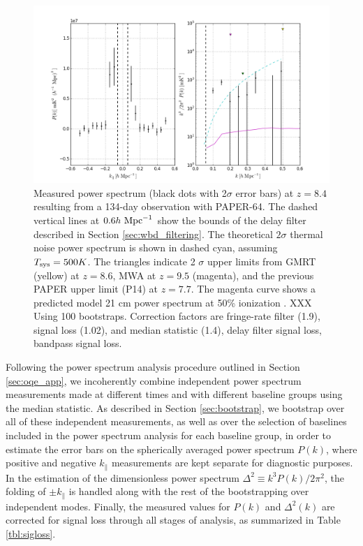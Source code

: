 \documentclass[twocolumn,numberedappendix]{emulateapj} \shorttitle{PSA64}
\newcommand{\hMpci}{h\ {\rm Mpc}^{-1}}
\newcommand{\Tsys}{T_{\rm sys}}
\begin{document}
\begin{figure}\centering
\includegraphics[width=2\columnwidth]{plots/pk_k3pk.png}
\caption{
Measured power spectrum (black dots with 2$\sigma$ error bars) at $z=8.4$
resulting from a 134-day observation with PAPER-64.  The dashed vertical lines
at $0.6\hMpci$ show the bounds of the delay filter described in Section
\ref{sec:wbd_filtering}. The theoretical $2\sigma$ thermal noise power spectrum
is shown in dashed cyan, assuming $\Tsys=500K$. The triangles indicate 2
$\sigma$ upper limits from GMRT \citep{paciga_et_al2011} (yellow) at $z=8.6$,
MWA \citep{dillon_et_al2013b} at $z=9.5$ (magenta), and the previous PAPER upper
limit (P14) at $z=7.7$. The magenta curve shows a predicted model 21 cm power
spectrum at 50\% ionization \citep{lidz_et_al2008}.
XXX Using 100 bootstraps. Correction factors are
fringe-rate filter (1.9), signal loss (1.02), and median statistic (1.4), delay
filter signal loss, bandpass signal loss.}
\label{fig:final_pspec}
\end{figure}

Following the power spectrum analysis procedure outlined in Section \ref{sec:oqe_app},
we incoherently combine independent power spectrum measurements made at different
times and with different baseline groups using the median statistic.  As described
in Section \ref{sec:bootstrap}, we bootstrap over all of these independent measurements,
as well as over the selection of baselines included in the power spectrum analysis for
each baseline group, in order to estimate the error bars on the spherically averaged
power spectrum $P(k)$, where positive and negative $k_\parallel$ measurements
are kept separate for diagnostic purposes.  In the estimation of the 
dimensionless power spectrum
$\Delta^{2}\equiv{k^{3}P(k)}/{2\pi^{2}}$, the folding of $\pm k_\parallel$ is
handled along with the rest of the bootstrapping over independent modes.
Finally, the measured values for $P(k)$ and $\Delta^2(k)$ are corrected for signal
loss through all stages of analysis, as summarized in Table \ref{tbl:sigloss}.
\end{document}
